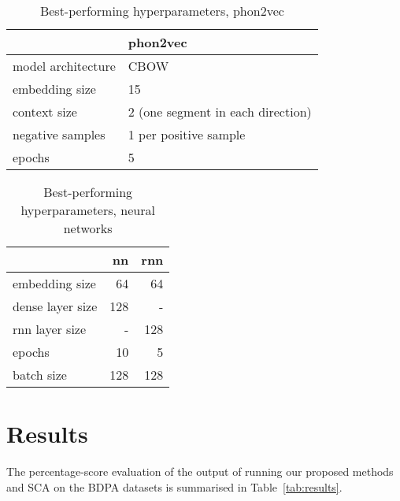 \documentclass[a4paper]{report}
\begin{document}
\begin{table}[h]
	\centering\small
	\begin{tabular}{*{2}{l}}
		\toprule
		& phon2vec \\
		\midrule
		model architecture & CBOW \\
		embedding size & 15 \\
		context size & 2 (one segment in each direction) \\
		negative samples & 1 per positive sample \\
		epochs & 5 \\
		\bottomrule
	\end{tabular}
	\caption{Best-performing hyperparameters, phon2vec}
	\label{tab:phon2vec}
\end{table}

\begin{table}[h]
	\centering\small
	\begin{tabular}{l *{2}{r}}
		\toprule
		& nn & rnn \\
		\midrule
		embedding size & 64 & 64 \\
		dense layer size & 128 & - \\
		rnn layer size & - & 128 \\
		epochs & 10 & 5 \\
		batch size & 128 & 128 \\
		\bottomrule
	\end{tabular}
	\caption{Best-performing hyperparameters, neural networks}
	\label{tab:networks}
\end{table}


\section{Results}

The percentage-score evaluation of the output of running our proposed methods and SCA on the BDPA datasets is summarised in Table~\ref{tab:results}.
\end{document}
